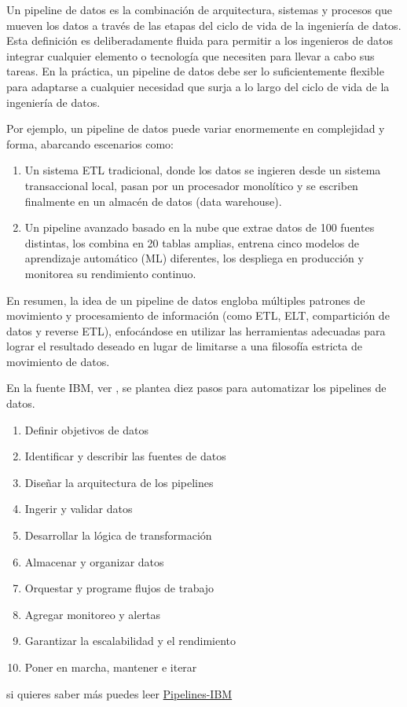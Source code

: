 Un pipeline de datos es la combinación de arquitectura, sistemas y procesos 
que mueven los datos a través de las etapas del ciclo de vida de la ingeniería
 de datos. Esta definición es deliberadamente fluida para permitir a los 
 ingenieros de datos integrar cualquier elemento o tecnología que necesiten 
 para llevar a cabo sus tareas. En la práctica, un pipeline de datos debe ser lo suficientemente flexible para adaptarse a cualquier necesidad que surja a lo largo del ciclo de vida de la ingeniería de datos.


Por ejemplo, un pipeline de datos puede variar enormemente en complejidad y forma, abarcando escenarios como:
\begin{enumerate}
\item Un sistema ETL tradicional, donde los datos se ingieren desde un sistema transaccional local, pasan por un procesador monolítico y se escriben finalmente en un almacén de datos (data warehouse).
\item Un pipeline avanzado basado en la nube que extrae datos de 100 fuentes distintas, los combina en 20 tablas amplias, entrena cinco modelos de aprendizaje automático (ML) diferentes, los despliega en producción y monitorea su rendimiento continuo.
\end{enumerate}
En resumen, la idea de un pipeline de datos engloba múltiples patrones de movimiento y procesamiento de información (como ETL, ELT, compartición de datos y reverse ETL), enfocándose en utilizar las herramientas adecuadas para lograr el resultado deseado en lugar de limitarse a una filosofía estricta de movimiento de datos.

En la fuente IBM, ver \cite{ibm_data_engineering}, se plantea diez pasos para automatizar los pipelines de datos. 

\begin{enumerate}
    \item Definir objetivos de datos
    \item Identificar y describir las fuentes de datos
    \item Diseñar la arquitectura de los pipelines
    \item Ingerir y validar datos
    \item Desarrollar la lógica de transformación
    \item Almacenar y organizar datos
    \item Orquestar y programe flujos de trabajo
    \item Agregar monitoreo y alertas
    \item Garantizar la escalabilidad y el rendimiento
    \item Poner en marcha, mantener e iterar
\end{enumerate}
si quieres saber más puedes leer \href{https://www.ibm.com/mx-es/think/topics/how-to-automate-data-pipelines-in-10-steps#2102599120}{Pipelines-IBM}